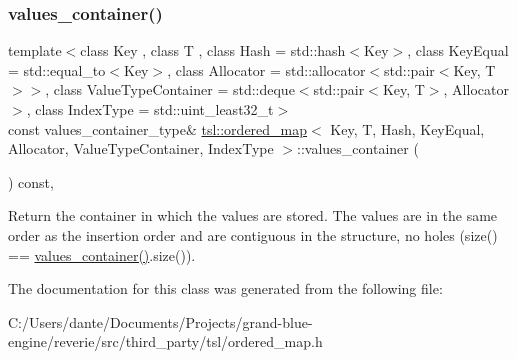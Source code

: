 \subsubsection{\texorpdfstring{values\_container()}{values\_container()}}
{\footnotesize\ttfamily template$<$class Key , class T , class Hash  = std\+::hash$<$\+Key$>$, class Key\+Equal  = std\+::equal\+\_\+to$<$\+Key$>$, class Allocator  = std\+::allocator$<$std\+::pair$<$\+Key, T$>$$>$, class Value\+Type\+Container  = std\+::deque$<$std\+::pair$<$\+Key, T$>$, Allocator$>$, class Index\+Type  = std\+::uint\+\_\+least32\+\_\+t$>$ \\
const values\+\_\+container\+\_\+type\& \mbox{\hyperlink{classtsl_1_1ordered__map}{tsl\+::ordered\+\_\+map}}$<$ Key, T, Hash, Key\+Equal, Allocator, Value\+Type\+Container, Index\+Type $>$\+::values\+\_\+container (\begin{DoxyParamCaption}{ }\end{DoxyParamCaption}) const\hspace{0.3cm}{\ttfamily [inline]}, {\ttfamily [noexcept]}}

Return the container in which the values are stored. The values are in the same order as the insertion order and are contiguous in the structure, no holes (size() == \mbox{\hyperlink{classtsl_1_1ordered__map_abb69bca0a80def48ae806078d77175cb}{values\+\_\+container()}}.size()). 

The documentation for this class was generated from the following file\+:\begin{DoxyCompactItemize}
\item 
C\+:/\+Users/dante/\+Documents/\+Projects/grand-\/blue-\/engine/reverie/src/third\+\_\+party/tsl/ordered\+\_\+map.\+h\end{DoxyCompactItemize}
